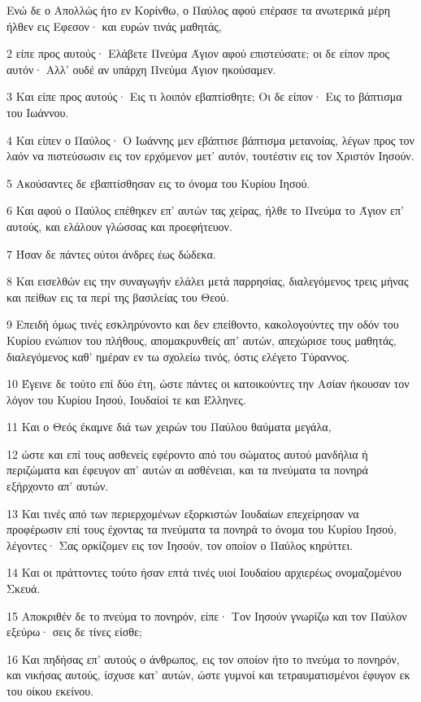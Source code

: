 \par Ενώ δε ο Απολλώς ήτο εν Κορίνθω, ο Παύλος αφού επέρασε τα ανωτερικά μέρη ήλθεν εις Εφεσον· και ευρών τινάς μαθητάς,
\par 2 είπε προς αυτούς· Ελάβετε Πνεύμα Άγιον αφού επιστεύσατε; οι δε είπον προς αυτόν· Αλλ' ουδέ αν υπάρχη Πνεύμα Άγιον ηκούσαμεν.
\par 3 Και είπε προς αυτούς· Εις τι λοιπόν εβαπτίσθητε; Οι δε είπον· Εις το βάπτισμα του Ιωάννου.
\par 4 Και είπεν ο Παύλος· Ο Ιωάννης μεν εβάπτισε βάπτισμα μετανοίας, λέγων προς τον λαόν να πιστεύσωσιν εις τον ερχόμενον μετ' αυτόν, τουτέστιν εις τον Χριστόν Ιησούν.
\par 5 Ακούσαντες δε εβαπτίσθησαν εις το όνομα του Κυρίου Ιησού.
\par 6 Και αφού ο Παύλος επέθηκεν επ' αυτών τας χείρας, ήλθε το Πνεύμα το Άγιον επ' αυτούς, και ελάλουν γλώσσας και προεφήτευον.
\par 7 Ήσαν δε πάντες ούτοι άνδρες έως δώδεκα.
\par 8 Και εισελθών εις την συναγωγήν ελάλει μετά παρρησίας, διαλεγόμενος τρεις μήνας και πείθων εις τα περί της βασιλείας του Θεού.
\par 9 Επειδή όμως τινές εσκληρύνοντο και δεν επείθοντο, κακολογούντες την οδόν του Κυρίου ενώπιον του πλήθους, απομακρυνθείς απ' αυτών, απεχώρισε τους μαθητάς, διαλεγόμενος καθ' ημέραν εν τω σχολείω τινός, όστις ελέγετο Τύραννος.
\par 10 Έγεινε δε τούτο επί δύο έτη, ώστε πάντες οι κατοικούντες την Ασίαν ήκουσαν τον λόγον του Κυρίου Ιησού, Ιουδαίοί τε και Έλληνες.
\par 11 Και ο Θεός έκαμνε διά των χειρών του Παύλου θαύματα μεγάλα,
\par 12 ώστε και επί τους ασθενείς εφέροντο από του σώματος αυτού μανδήλια ή περιζώματα και έφευγον απ' αυτών αι ασθένειαι, και τα πνεύματα τα πονηρά εξήρχοντο απ' αυτών.
\par 13 Και τινές από των περιερχομένων εξορκιστών Ιουδαίων επεχείρησαν να προφέρωσιν επί τους έχοντας τα πνεύματα τα πονηρά το όνομα του Κυρίου Ιησού, λέγοντες· Σας ορκίζομεν εις τον Ιησούν, τον οποίον ο Παύλος κηρύττει.
\par 14 Και οι πράττοντες τούτο ήσαν επτά τινές υιοί Ιουδαίου αρχιερέως ονομαζομένου Σκευά.
\par 15 Αποκριθέν δε το πνεύμα το πονηρόν, είπε· Τον Ιησούν γνωρίζω και τον Παύλον εξεύρω· σεις δε τίνες είσθε;
\par 16 Και πηδήσας επ' αυτούς ο άνθρωπος, εις τον οποίον ήτο το πνεύμα το πονηρόν, και νικήσας αυτούς, ίσχυσε κατ' αυτών, ώστε γυμνοί και τετραυματισμένοι έφυγον εκ του οίκου εκείνου.
